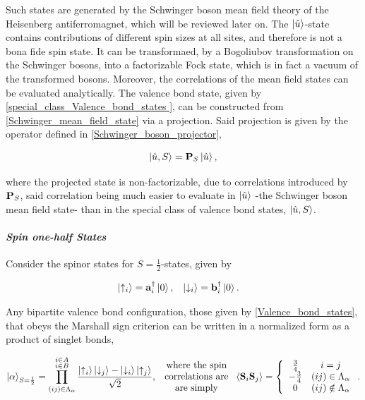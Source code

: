 \documentclass{homework}
\begin{document}
Such states are generated by the Schwinger boson mean field theory of the Heisenberg antiferromagnet, which will be reviewed later on. The $\ket{\hat{u}}$-state contains contributions of different spin sizes at all sites, and therefore is not a bona fide spin state. It can be transformaed, by a Bogoliubov transformation on the Schwinger bosons, into a factorizable Fock state, which is in fact a vacuum of the transformed bosons. Moreover, the correlations of the mean field states can be evaluated analytically. The valence bond state, given by \cref{special_class_Valence_bond_states }, can be constructed from \cref{Schwinger_mean_field_state} via a projection. Said projection is given by the operator defined in \cref{Schwinger_boson_projector},

$$
    \ket{\hat{u}, S} = \mathbf{P}_S \ket{\hat{u}},
$$

where the projected state is non-factorizable, due to correlations introduced by ${\bf P}_S$, said correlation being much easier to evaluate in $\ket{\hat{u}}$ -the Schwinger boson mean field state- than in the special class of valence bond states, $\ket{\hat{u}, S}$. \\

\paragraph{\textit{Spin one-half States}}

Consider the spinor states for $S = \frac{1}{2}$-states, given by 

\begin{align}
    \ket{\uparrow_i} &= {\bf a}_i^\dagger \ket{0}, & \ket{\downarrow_i} &= {\bf b}_i^\dagger  \ket{0}.
\end{align}

Any bipartite valence bond configuration, those given by \cref{Valence_bond_states}, that obeys the Marshall sign criterion can be written in a normalized form as a product of singlet bonds,

\begin{equation}
\begin{split}
    \ket{\alpha}_{S = \frac{1}{2}} = \prod_{(ij) \in \Lambda_{\alpha}}^{{\substack{{i \in A}\\
                                 {i \in B} }}}
    \frac{\ket{\uparrow_i}\ket{\downarrow_j}-\ket{\downarrow_i} \ket{\uparrow_j}}{\sqrt{2}},  \begin{array}{c}
         \textnormal{ where the spin }  \\
         \textnormal{ correlations are } \\
         \textnormal{ are simply } 
    \end{array} \langle {\bf S}_i {\bf S}_j \rangle = \left\{\begin{array}{cc}
         \frac{3}{4} & i = j  \\
         -\frac{3}{4} & (ij) \in \Lambda_{\alpha} \\
         0 & (ij) \notin \Lambda_{\alpha}
    \end{array}\right..
    \label{bipartite_valence_bond_states_corrs}
\end{split}
\end{equation}
\end{document}
